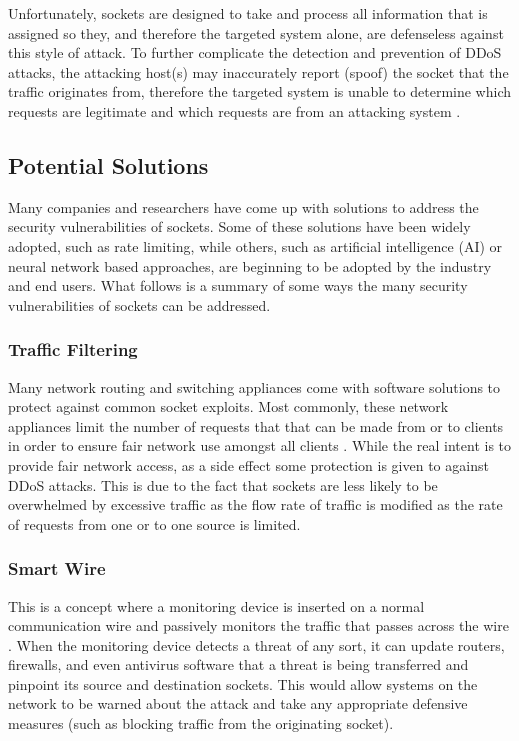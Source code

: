 \documentclass[conference, 12pt]{IEEEtran}
\begin{document}
Unfortunately, sockets are designed to take and process all information that is assigned so they, and therefore the targeted system alone, are defenseless against this style of attack. To further complicate the detection and prevention of DDoS attacks, the attacking host(s) may inaccurately report (spoof) the socket that the traffic originates from, therefore the targeted system is unable to determine which requests are legitimate and which requests are from an attacking system \cite{Herbert}.

\subsection{Potential Solutions}
Many companies and researchers have come up with solutions to address the security vulnerabilities of sockets. Some of these solutions have been widely adopted, such as rate limiting, while others, such as artificial intelligence (AI) or neural network based approaches, are beginning to be adopted by the industry and end users. What follows is a summary of some ways the many security vulnerabilities of sockets can be addressed.

\subsubsection{Traffic Filtering}
Many network routing and switching appliances come with software solutions to protect against common socket exploits. Most commonly, these network appliances limit the number of requests that that can be made from or to clients in order to ensure fair network use amongst all clients \cite{Herbert}. While the real intent is to provide fair network access, as a side effect some protection is given to against DDoS attacks. This is due to the fact that sockets are less likely to be overwhelmed by excessive traffic as the flow rate of traffic is modified as the rate of requests from one or to one source is limited.

\subsubsection{Smart Wire}
This is a concept where a monitoring device is inserted on a normal communication wire and passively monitors the traffic that passes across the wire \cite{Herbert}. When the monitoring device detects a threat of any sort, it can update routers, firewalls, and even antivirus software that a threat is being transferred and pinpoint its source and destination sockets. This would allow systems on the network to be warned about the attack and take any appropriate defensive measures (such as blocking traffic from the originating socket).
\end{document}
